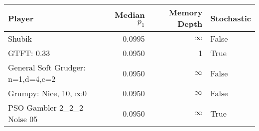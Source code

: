 \begin{tabular}{lrrl}
\toprule
                            Player &  Median $p_1$ &  Memory Depth & Stochastic \\
\midrule
                            Shubik &        0.0995 &            \(\infty\) &      False \\
                        GTFT: 0.33 &        0.0950 &             1 &       True \\
 General Soft Grudger: n=1,d=4,c=2 &        0.0950 &            \(\infty\) &      False \\
             Grumpy: Nice, 10, \(\infty\)0 &        0.0950 &            \(\infty\) &      False \\
        PSO Gambler 2\_2\_2 Noise 05 &        0.0950 &            \(\infty\) &       True \\
\bottomrule
\end{tabular}
